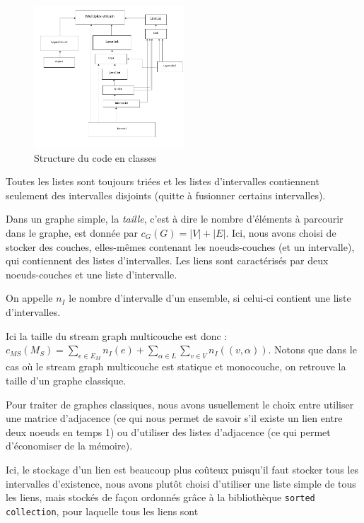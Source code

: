 \documentclass[11pt,a4paper]{article}
\theoremstyle{definition}
\theoremstyle{remark}
\theoremstyle{remark}
\def \stgm {stream graph multicouche}
\begin{document}
	
	
	\begin{figure}[H]
		\centering
		\includegraphics[width=0.5\textwidth]{codeStructure.JPG}
		\caption{Structure du code en classes }
	\end{figure}
	
	Toutes les listes sont toujours triées et les listes d'intervalles contiennent seulement des intervalles disjoints (quitte à fusionner certains intervalles).
	
	Dans un graphe simple, la {\em taille}, c'est à dire le nombre d'éléments à parcourir dans le graphe, est donnée par $c_G(G)=|V|+|E|$. Ici, nous avons choisi de stocker des couches, elles-mêmes contenant les noeuds-couches (et un intervalle), qui contiennent des listes d'intervalles. Les liens sont caractérisés par deux noeuds-couches et une liste d'intervalle.
	
	On appelle $n_I$ le nombre d'intervalle d'un ensemble, si celui-ci contient une liste d'intervalles.
	
	Ici la taille du \stgm{} est donc : $c_{MS}(M_S)=\sum_{e \in E_M} n_I(e) + \sum_{\alpha \in L} \sum_{v \in V} n_I((v,\alpha))$. Notons que dans le cas où le \stgm{} est statique et monocouche, on retrouve la taille d'un graphe classique.
	
	Pour traiter de graphes classiques, nous avons usuellement le choix entre utiliser une matrice d'adjacence (ce qui nous permet de savoir s'il existe un lien entre deux noeuds en temps 1) ou d'utiliser des listes d'adjacence (ce qui permet d'économiser de la mémoire).
	
	Ici, le stockage d'un lien est beaucoup plus coûteux puisqu'il faut stocker tous les intervalles d'existence, nous avons plutôt choisi d'utiliser une liste simple de tous les liens, mais stockés de façon ordonnés grâce à la bibliothèque \texttt{sorted collection}, pour laquelle tous les liens sont 
	
\end{document}
